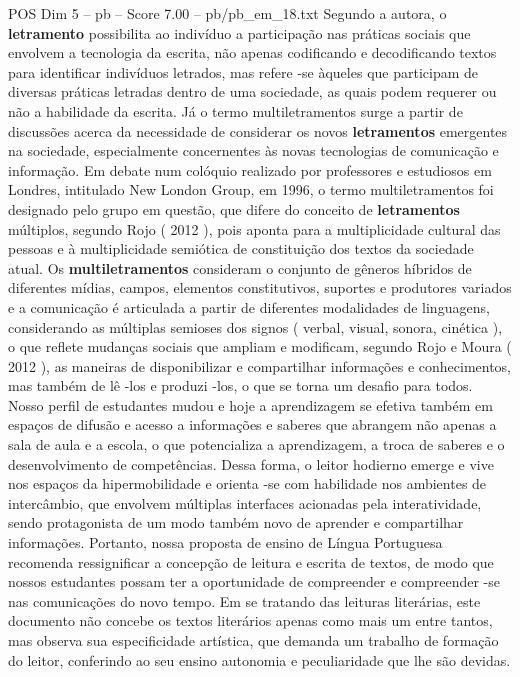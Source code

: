 \begin{textsample}{POS Dim 5 – pb – Score 7.00 – pb/pb\_em\_18.txt}
Segundo a autora, o \textbf{letramento} possibilita ao indivíduo a participação nas práticas sociais que envolvem a tecnologia da escrita, não apenas codificando e decodificando textos para identificar indivíduos letrados, mas refere -se àqueles que participam de diversas práticas letradas dentro de uma sociedade, as quais podem requerer ou não a habilidade da escrita.
Já o termo multiletramentos surge a partir de discussões acerca da necessidade de considerar os novos \textbf{letramentos} emergentes na sociedade, especialmente concernentes às novas tecnologias de comunicação e informação.
Em debate num colóquio realizado por professores e estudiosos em Londres, intitulado New London Group, em 1996, o termo multiletramentos foi designado pelo grupo em questão, que difere do conceito de \textbf{letramentos} múltiplos, segundo Rojo ( 2012 ), pois aponta para a multiplicidade cultural das pessoas e à multiplicidade semiótica de constituição dos textos da sociedade atual.
Os \textbf{multiletramentos} consideram o conjunto de gêneros híbridos de diferentes mídias, campos, elementos constitutivos, suportes e produtores variados e a comunicação é articulada a partir de diferentes modalidades de linguagens, considerando as múltiplas semioses dos signos ( verbal, visual, sonora, cinética ), o que reflete mudanças sociais que ampliam e modificam, segundo Rojo e Moura ( 2012 ), as maneiras de disponibilizar e compartilhar informações e conhecimentos, mas também de lê -los e produzi -los, o que se torna um desafio para todos.
Nosso perfil de estudantes mudou e hoje a aprendizagem se efetiva também em espaços de difusão e acesso a informações e saberes que abrangem não apenas a sala de aula e a escola, o que potencializa a aprendizagem, a troca de saberes e o desenvolvimento de competências.
Dessa forma, o leitor hodierno emerge e vive nos espaços da hipermobilidade e orienta -se com habilidade nos ambientes de intercâmbio, que envolvem múltiplas interfaces acionadas pela interatividade, sendo protagonista de um modo também novo de aprender e compartilhar informações.
Portanto, nossa proposta de ensino de Língua Portuguesa recomenda ressignificar a concepção de leitura e escrita de textos, de modo que nossos estudantes possam ter a oportunidade de compreender e compreender -se nas comunicações do novo tempo.
Em se tratando das leituras literárias, este documento não concebe os textos literários apenas como mais um entre tantos, mas observa sua especificidade artística, que demanda um trabalho de formação do leitor, conferindo ao seu ensino autonomia e peculiaridade que lhe são devidas.

\end{textsample}
